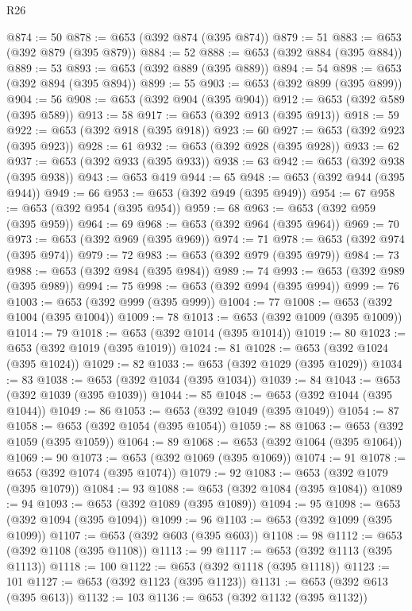 \begin{lexlean}{R26}
\begin{coremodule}
@874 := 50
@878 := @653 (@392 @874 (@395 @874))
@879 := 51
@883 := @653 (@392 @879 (@395 @879))
@884 := 52
@888 := @653 (@392 @884 (@395 @884))
@889 := 53
@893 := @653 (@392 @889 (@395 @889))
@894 := 54
@898 := @653 (@392 @894 (@395 @894))
@899 := 55
@903 := @653 (@392 @899 (@395 @899))
@904 := 56
@908 := @653 (@392 @904 (@395 @904))
@912 := @653 (@392 @589 (@395 @589))
@913 := 58
@917 := @653 (@392 @913 (@395 @913))
@918 := 59
@922 := @653 (@392 @918 (@395 @918))
@923 := 60
@927 := @653 (@392 @923 (@395 @923))
@928 := 61
@932 := @653 (@392 @928 (@395 @928))
@933 := 62
@937 := @653 (@392 @933 (@395 @933))
@938 := 63
@942 := @653 (@392 @938 (@395 @938))
@943 := @653 @419
@944 := 65
@948 := @653 (@392 @944 (@395 @944))
@949 := 66
@953 := @653 (@392 @949 (@395 @949))
@954 := 67
@958 := @653 (@392 @954 (@395 @954))
@959 := 68
@963 := @653 (@392 @959 (@395 @959))
@964 := 69
@968 := @653 (@392 @964 (@395 @964))
@969 := 70
@973 := @653 (@392 @969 (@395 @969))
@974 := 71
@978 := @653 (@392 @974 (@395 @974))
@979 := 72
@983 := @653 (@392 @979 (@395 @979))
@984 := 73
@988 := @653 (@392 @984 (@395 @984))
@989 := 74
@993 := @653 (@392 @989 (@395 @989))
@994 := 75
@998 := @653 (@392 @994 (@395 @994))
@999 := 76
@1003 := @653 (@392 @999 (@395 @999))
@1004 := 77
@1008 := @653 (@392 @1004 (@395 @1004))
@1009 := 78
@1013 := @653 (@392 @1009 (@395 @1009))
@1014 := 79
@1018 := @653 (@392 @1014 (@395 @1014))
@1019 := 80
@1023 := @653 (@392 @1019 (@395 @1019))
@1024 := 81
@1028 := @653 (@392 @1024 (@395 @1024))
@1029 := 82
@1033 := @653 (@392 @1029 (@395 @1029))
@1034 := 83
@1038 := @653 (@392 @1034 (@395 @1034))
@1039 := 84
@1043 := @653 (@392 @1039 (@395 @1039))
@1044 := 85
@1048 := @653 (@392 @1044 (@395 @1044))
@1049 := 86
@1053 := @653 (@392 @1049 (@395 @1049))
@1054 := 87
@1058 := @653 (@392 @1054 (@395 @1054))
@1059 := 88
@1063 := @653 (@392 @1059 (@395 @1059))
@1064 := 89
@1068 := @653 (@392 @1064 (@395 @1064))
@1069 := 90
@1073 := @653 (@392 @1069 (@395 @1069))
@1074 := 91
@1078 := @653 (@392 @1074 (@395 @1074))
@1079 := 92
@1083 := @653 (@392 @1079 (@395 @1079))
@1084 := 93
@1088 := @653 (@392 @1084 (@395 @1084))
@1089 := 94
@1093 := @653 (@392 @1089 (@395 @1089))
@1094 := 95
@1098 := @653 (@392 @1094 (@395 @1094))
@1099 := 96
@1103 := @653 (@392 @1099 (@395 @1099))
@1107 := @653 (@392 @603 (@395 @603))
@1108 := 98
@1112 := @653 (@392 @1108 (@395 @1108))
@1113 := 99
@1117 := @653 (@392 @1113 (@395 @1113))
@1118 := 100
@1122 := @653 (@392 @1118 (@395 @1118))
@1123 := 101
@1127 := @653 (@392 @1123 (@395 @1123))
@1131 := @653 (@392 @613 (@395 @613))
@1132 := 103
@1136 := @653 (@392 @1132 (@395 @1132))

\end{coremodule}
\end{lexlean}
